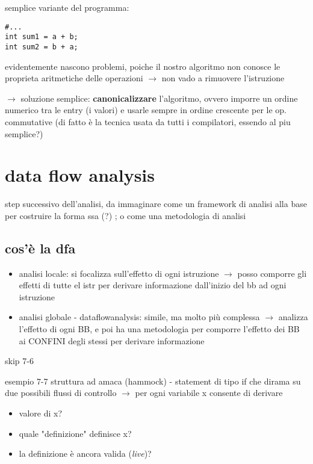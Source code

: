 semplice variante del programma:
\begin{lstlisting}
#...
int sum1 = a + b;
int sum2 = b + a;\end{lstlisting}

evidentemente nascono problemi, poiche il nostro algoritmo non conosce le proprieta aritmetiche delle operazioni $\rightarrow$ non vado a rimuovere l'istruzione

$\rightarrow$ soluzione semplice: \textbf{canonicalizzare} l'algoritmo, ovvero imporre un ordine numerico tra le entry (i valori) e usarle sempre in ordine crescente per le op. commutative (di fatto \`e la tecnica usata da tutti i compilatori, essendo al piu semplice?)

\section{data flow analysis}

step successivo dell'analisi, da immaginare come un framework di analisi alla base per costruire la forma ssa (?) ; o come una metodologia di analisi

\subsection{cos'\`e la dfa}

\begin{itemize}
  \item analisi locale: si focalizza sull'effetto di ogni istruzione $\rightarrow$ posso comporre gli effetti di tutte el istr per derivare informazione dall'inizio del bb ad ogni istruzione
  \item analisi globale - dataflowanalysis: simile, ma molto pi\`u complessa $\rightarrow$ analizza l'effetto di ogni BB, e poi ha una metodologia per comporre l'effetto dei BB ai CONFINI degli stessi per derivare informazione
\end{itemize}

skip 7-6

esempio 7-7 struttura ad amaca (hammock) - statement di tipo if che dirama su due possibili flussi di controllo $\rightarrow$ per ogni variabile x consente di derivare
\begin{itemize}
  \item valore di x?
  \item quale "definizione" definisce x?
  \item la definizione \`e ancora valida (\textit{live})?
\end{itemize}

